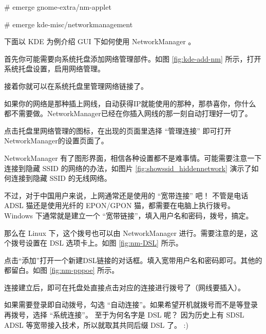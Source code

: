 \begin{code}
\# emerge gnome-extra/nm-applet

\# emerge kde-misc/networkmanagement
\end{code}

下面以 KDE 为例介绍 GUI 下如何使用 NetworkManager 。

首先你可能需要向系统托盘添加网络管理部件。如图 \ref{fig:kde-add-nm} 所示，打开系统托盘设置，启用网络管理。


接着你就可以在系统托盘里管理网络链接了。

如果你的网络是那种插上网线，自动获得IP就能使用的那种，那恭喜你，你什么都不需要做。NetworkManager已经在你插入网线的那一刻自动打理好一切了。

点击托盘里网络管理的图标，在出现的页面里选择 “管理连接” 即可打开NetworkManager的设置页面了。

NetworkManager 有了图形界面，相信各种设置都不是难事情。可能需要注意一下连接到隐藏 SSID 的网络的办法，如图片 \ref{fig:showssid_hiddennetwork} 演示了如何连接到隐藏 SSID 的无线网络。


不过，对于中国用户来说，上网通常还是使用的 “宽带连接” 吧！ 不管是电话 ADSL 猫还是使用光纤的 EPON/GPON 猫，都需要在电脑上执行拨号。Windows 下通常就是建立一个 “宽带链接”，填入用户名和密码，拨号，搞定。

那么在 Linux 下，这个拨号也可以由 NetworkManager 进行。需要注意的是，这个拨号设置在 DSL 选项卡上。如图 \ref{fig:nm-DSL} 所示。


点击“添加”打开一个新建DSL链接的对话框。填入宽带用户名和密码即可。其他的都留白。如图 \ref{fig:nm-pppoe} 所示。


连接建立后，即可在托盘处直接点击对应的连接进行拨号了（网线要插入）。

\begin{notice}
如果需要登录即自动拨号，勾选 “自动连接”。如果希望开机就拨号而不是等登录再拨号，选择 “系统连接”。
至于为何名字是 DSL 呢？ 因为历史上有 SDSL ADSL 等宽带接入技术，所以就取其共同后缀 DSL 了。 :)
\end{notice}




